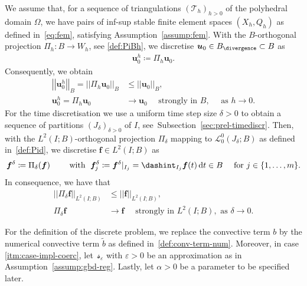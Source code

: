 \documentclass[reqno,a4paper]{amsart}
\def\norm#1{\left|\!\left| #1 \right|\!\right|}
\def\vec#1{\boldsymbol{#1}}
\def\d{{\rm d}}
\def\dt{\,\d t}
\def\Bh{{W_h}}
\def\Bdiv{{B_{\divergence}}}
\def\bf{\vec{f}}
\def\bu{\vec{u}}
\def\Srel{\vec{\mathcal{s}}}
\def\Seps{\Srel_{\varepsilon}}
\def\tria{\mathcal{T}_h}
\def\Pid{{\Pi_\delta}}
\def\PiBh{{\Pi_h}}
\begin{document}
We assume that, for a sequence of triangulations $(\tria)_{h>0}$ of the polyhedral domain $\Omega$, we have pairs of inf-sup stable finite element spaces $(X_h,Q_h)$ as defined in~\eqref{eq:fem}, satisfying  Assumption~\ref{assump:fem}. 
With the $B$-orthogonal projection $\PiBh\colon B\to\Bh$, see \eqref{def:PiBh}, we discretise $ \bu_0 \in \Bdiv \subset B$ as 
\begin{align}\label{def:u0-discr}
	\bu_{0}^{h} \coloneqq \PiBh  \bu_0. 
\end{align}
Consequently, we obtain 
\begin{align}\label{est:PiBh-stab-u0}
	\norm{ \bu^h_0}_B  = \norm{\PiBh  \bu_0}_B &\leq	\norm{ \bu_0}_B,\\
	\label{eq:conv-u0}
	\bu_0^h 
	= \PiBh  \bu_0 & \to   \bu_0 \quad \text{ strongly in } B, 
	\quad \text{ as } h \to 0. 
\end{align}
For the time discretisation we use a uniform time step size $\delta>0$ to obtain a sequence of partitions $(J_\delta)_{\delta>0}$ of $I$, see~Subsection~\ref{sec:prel-timediscr}. 
Then, with the $L^2(I;B)$-orthogonal projection $\Pid$ mapping to $\mathcal{L}^0_0(J_{\delta};B)$ as defined in~\eqref{def:Pid}, we discretise $ \bf \in L^2(I;B)$ as 
\begin{align}\label{def:f-discr}
	\bf^{\delta} \coloneqq \Pid( \bf) \qquad \text{ with } \;
	\bf^{\delta}_j \coloneqq  \bf^{\delta} |_{I_j} 
	=  \dashint_{I_j}  \bf(t) \dt  \in B \quad \text{ for  } j \in \{1, \ldots, m\}. 
\end{align}
In consequence, we have that
\begin{align}\label{est:L2-stab-f}
	\norm{\Pid  \bf }_{L^2(I;B)}& \leq 	\norm{  \bf }_{L^2(I;B)},\\
	\label{eq:f-conv}
	\Pid  \bf &\to \bf \quad \text{ strongly in } L^2(I;B), \text{ as } \delta \to 0.
\end{align}

For the definition of the discrete problem, we replace the convective term $b$ by the numerical convective term $\widetilde{b}$  as defined in~\eqref{def:conv-term-num}. 
Moreover, in case \ref{itm:case-impl-coerc}, let~$\Seps$ with $\varepsilon>0$  be an approximation as in Assumption~\ref{assump:gbd-reg}. Lastly, let
$\alpha>0$ be a parameter to be specified later. 
\end{document}
